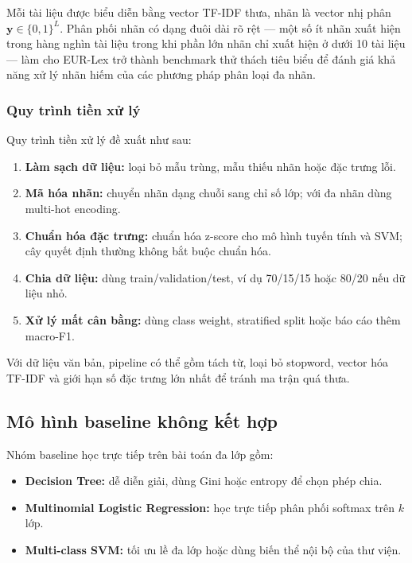 Mỗi tài liệu được biểu diễn bằng vector TF-IDF thưa, nhãn là vector nhị phân $\mathbf{y} \in \{0,1\}^L$. Phân phối nhãn có dạng đuôi dài rõ rệt — một số ít nhãn xuất hiện trong hàng nghìn tài liệu trong khi phần lớn nhãn chỉ xuất hiện ở dưới 10 tài liệu — làm cho EUR-Lex trở thành benchmark thử thách tiêu biểu để đánh giá khả năng xử lý nhãn hiếm của các phương pháp phân loại đa nhãn.

\subsubsection{Quy trình tiền xử lý}

Quy trình tiền xử lý đề xuất như sau:
\begin{enumerate}[leftmargin=2em]
  \item \textbf{Làm sạch dữ liệu:} loại bỏ mẫu trùng, mẫu thiếu nhãn hoặc đặc trưng lỗi.
  \item \textbf{Mã hóa nhãn:} chuyển nhãn dạng chuỗi sang chỉ số lớp; với đa nhãn dùng multi-hot encoding.
  \item \textbf{Chuẩn hóa đặc trưng:} chuẩn hóa z-score cho mô hình tuyến tính và SVM; cây quyết định thường không bắt buộc chuẩn hóa.
  \item \textbf{Chia dữ liệu:} dùng train/validation/test, ví dụ 70/15/15 hoặc 80/20 nếu dữ liệu nhỏ.
  \item \textbf{Xử lý mất cân bằng:} dùng class weight, stratified split hoặc báo cáo thêm macro-F1.
\end{enumerate}

Với dữ liệu văn bản, pipeline có thể gồm tách từ, loại bỏ stopword, vector hóa TF-IDF và giới hạn số đặc trưng lớn nhất để tránh ma trận quá thưa.

\subsection{Mô hình baseline không kết hợp}

Nhóm baseline học trực tiếp trên bài toán đa lớp gồm:
\begin{itemize}[leftmargin=2em]
  \item \textbf{Decision Tree:} dễ diễn giải, dùng Gini hoặc entropy để chọn phép chia.
  \item \textbf{Multinomial Logistic Regression:} học trực tiếp phân phối softmax trên $k$ lớp.
  \item \textbf{Multi-class SVM:} tối ưu lề đa lớp hoặc dùng biến thể nội bộ của thư viện.
\end{itemize}

